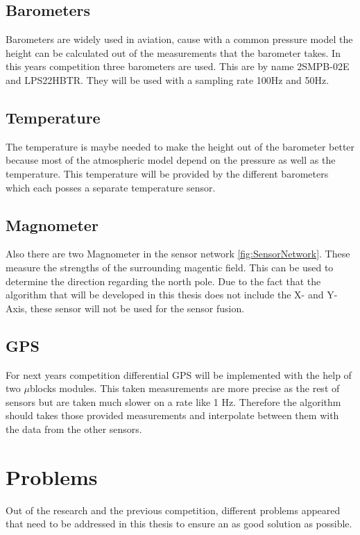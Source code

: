  \subsection{Barometers}
 Barometers are widely used in aviation, cause with a common pressure model the height can be calculated out of the measurements that the barometer takes.
 In this years competition three barometers are used. This are by name 2SMPB-02E and LPS22HBTR. They will be used with a sampling rate 100Hz and 50Hz. %
 
 \subsection{Temperature}
 The temperature is maybe needed to make the height out of the barometer better because most of the atmospheric model depend on the pressure as well as the temperature.
 This temperature will be provided by the different barometers which each posses a separate temperature sensor. 
 
 \subsection{Magnometer}
 Also there are two Magnometer in the sensor network \ref{fig:SensorNetwork}. These measure the strengths of the surrounding magentic field.
 This can be used to determine the direction regarding the north pole.
 Due to the fact that the algorithm that will be developed in this thesis does not include the X- and Y-Axis,
 these sensor will not be used for the sensor fusion.
 
 \subsection{GPS}
 For next years competition differential GPS will be implemented with the help of two $\mu$blocks modules.
 This taken measurements are more precise as the rest of sensors but are taken much slower on a rate like 1 Hz. Therefore the algorithm should takes
 those provided measurements and interpolate between them with the data from the other sensors.
 
 
 \section{Problems}
 Out of the research and the previous competition, different problems appeared that need to be addressed in this thesis to ensure an as good solution as possible.
 
